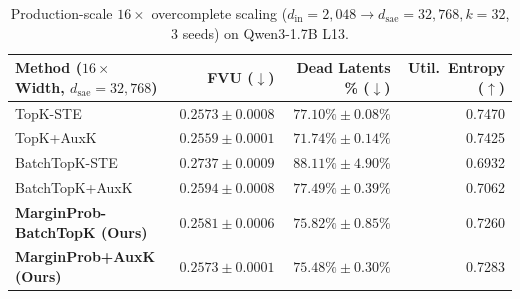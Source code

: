 \documentclass[10pt,twocolumn]{article}
\begin{document}
\begin{table}[t]
  \centering
  \caption{Production-scale $16\times$ overcomplete scaling ($d_{\mathrm{in}}=2{{,}}048 \to d_{\mathrm{sae}}=32{{,}}768, k=32$, 3 seeds) on Qwen3-1.7B L13.}
  \label{tab:sae_16x}
  \scriptsize
  \begin{tabular}{lrrr}
    \toprule
    Method ($16\times$ Width, $d_{\mathrm{sae}}=32{{,}}768$) & FVU ($\downarrow$) & Dead Latents \% ($\downarrow$) & Util.\ Entropy ($\uparrow$) \\
    \midrule
    TopK-STE \citep{gao2024scaling} & $0.2573\pm0.0008$ & $77.10\%\pm0.08\%$ & 0.7470 \\
    TopK+AuxK \citep{gao2024scaling} & $0.2559\pm0.0001$ & $71.74\%\pm0.14\%$ & 0.7425 \\
    BatchTopK-STE \citep{bussmann2024batchtopk} & $0.2737\pm0.0009$ & $88.11\%\pm4.90\%$ & 0.6932 \\
    BatchTopK+AuxK \citep{bussmann2024batchtopk} & $0.2594\pm0.0008$ & $77.49\%\pm0.39\%$ & 0.7062 \\
    \textbf{MarginProb-BatchTopK (Ours)} & $0.2581\pm0.0006$ & $75.82\%\pm0.85\%$ & 0.7260 \\
    \textbf{MarginProb+AuxK (Ours)} & $0.2573\pm0.0001$ & $75.48\%\pm0.30\%$ & 0.7283 \\
    \bottomrule
  \end{tabular}
\end{table}

\begin{table}[t]
  \centering
  \caption{SAEBench-style Sparse Probing ($k \in \{1,5,20\}$ top latents/class) and Automated LLM-as-a-Judge Feature Interpretability (Qwen3.8-27B blind detection F1 \& balanced accuracy, Qwen3-1.7B L13).}
  \label{tab:sae_autointerp}
  \scriptsize
\end{table}
\end{document}
